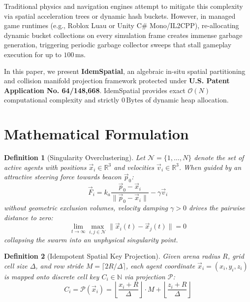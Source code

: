 \documentclass[journal,10pt,twocolumn]{article}
\newtheorem{definition}{Definition}
\begin{document}
Traditional physics and navigation engines attempt to mitigate this complexity via spatial acceleration trees or dynamic hash buckets. However, in managed game runtimes (e.g., Roblox Luau or Unity C\# Mono/IL2CPP), re-allocating dynamic bucket collections on every simulation frame creates immense garbage generation, triggering periodic garbage collector sweeps that stall gameplay execution for up to $100\,\text{ms}$.

In this paper, we present \textbf{IdemSpatial}, an algebraic in-situ spatial partitioning and collision manifold projection framework protected under \textbf{U.S. Patent Application No. 64/148,668}. IdemSpatial provides exact $\mathcal{O}(N)$ computational complexity and strictly $0\,\text{Bytes}$ of dynamic heap allocation.

\section{Mathematical Formulation}

\begin{definition}[Singularity Overclustering]
Let $\mathcal{N} = \{1, \dots, N\}$ denote the set of active agents with positions $\vec{x}_i \in \mathbb{R}^3$ and velocities $\vec{v}_i \in \mathbb{R}^3$. When guided by an attractive steering force towards beacon $\vec{p}_0$:
\begin{equation}
\vec{F}_i = k_a \frac{\vec{p}_0 - \vec{x}_i}{\|\vec{p}_0 - \vec{x}_i\|} - \gamma \vec{v}_i
\end{equation}
without geometric exclusion volumes, velocity damping $\gamma > 0$ drives the pairwise distance to zero:
\begin{equation}
\lim_{t \to \infty} \max_{i, j \in \mathcal{N}} \|\vec{x}_i(t) - \vec{x}_j(t)\| = 0
\end{equation}
collapsing the swarm into an unphysical singularity point.
\end{definition}

\begin{definition}[Idempotent Spatial Key Projection]
Given arena radius $R$, grid cell size $\Delta$, and row stride $M = \lceil 2R / \Delta \rceil$, each agent coordinate $\vec{x}_i = (x_i, y_i, z_i)$ is mapped onto discrete cell key $C_i \in \mathbb{N}$ via projection $\mathcal{P}$:
\begin{equation}
C_i = \mathcal{P}(\vec{x}_i) = \left\lfloor \frac{x_i + R}{\Delta} \right\rfloor \cdot M + \left\lfloor \frac{z_i + R}{\Delta} \right\rfloor
\end{equation}
\end{definition}
\end{document}
